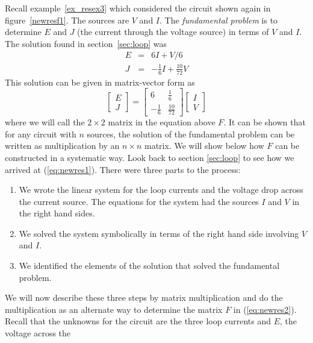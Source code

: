 Recall example~\ref{ex_resex3} which considered the circuit 
shown again in figure~\ref{newresf1}. The sources are $V$ and $I$. The 
{\em fundamental problem} is to determine $E$ and $J$ (the current through the 
voltage source) in terms of $V$ and $I$. The 
solution found in section~\ref{sec:loop} was 
\begin{eqnarray}
E & = & 6I + V/6 \label{eq:newres1} \\
J & = & -\frac{1}{6} I + \frac{10}{72} V \nonumber  
\end{eqnarray}
This solution can be given in matrix-vector form as 
\begin{equation}
\label{eq:newres2}
\left[ \begin{array}{c} E \\ J \end{array} \right] = 
\left[ \begin{array}{cc} 6 & \frac{1}{6} \\
                                       -\frac{1}{6} & \frac{10}{72} \end{array} \right] 
\left[ \begin{array}{c} I \\ V \end{array} \right]
\end{equation} 
where we will call the $2 \times 2$ matrix in the equation above $F$. It can be shown that 
for any circuit with $n$ sources, the solution of the fundamental problem 
can be written as multiplication by an $n \times n$ matrix. We will show below 
how $F$ can be constructed in a systematic way. Look back to section
\ref{sec:loop} to see how we arrived at (\ref{eq:newres1}). There were three 
parts to the process:
\begin{enumerate}
\item We wrote the linear system for the loop currents and the voltage drop across the 
current source. The equations for the system had the sources $I$ and $V$ in the 
right hand sides.
\item We solved the system symbolically in terms of the right hand side involving $V$ and $I$.
\item We identified the elements of the solution that solved the fundamental problem.  
\end{enumerate} 
We will now describe these three steps by matrix multiplication and do the multiplication 
as an alternate way to determine the matrix $F$ in (\ref{eq:newres2}). Recall that the 
unknowns for the circuit are the three loop currents and $E$, the voltage across the 

